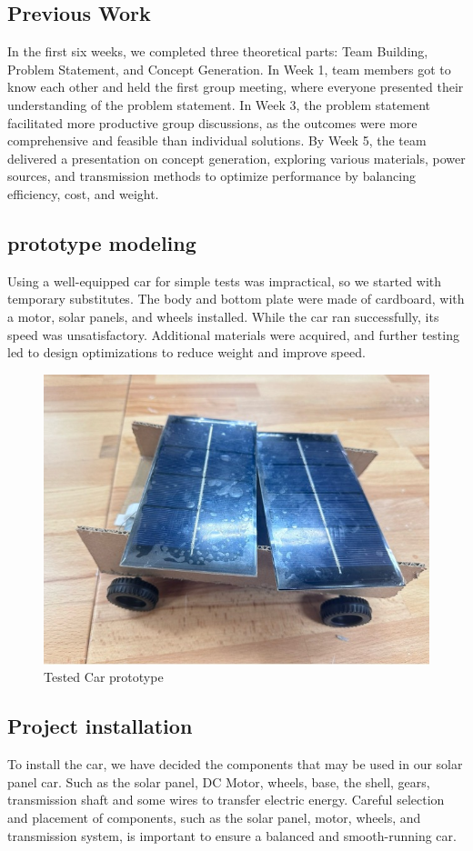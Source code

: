 \documentclass[12pt]{article}
\begin{document}
\subsection{Previous Work}
In the first six weeks, we completed three theoretical parts: Team Building, Problem Statement, and Concept Generation. In Week 1, team members got to know each other and held the first group meeting, where everyone presented their understanding of the problem statement. In Week 3, the problem statement facilitated more productive group discussions, as the outcomes were more comprehensive and feasible than individual solutions. By Week 5, the team delivered a presentation on concept generation, exploring various materials, power sources, and transmission methods to optimize performance by balancing efficiency, cost, and weight.
\subsection{prototype modeling}
Using a well-equipped car for simple tests was impractical, so we started with temporary substitutes. The body and bottom plate were made of cardboard, with a motor, solar panels, and wheels installed. While the car ran successfully, its speed was unsatisfactory. Additional materials were acquired, and further testing led to design optimizations to reduce weight and improve speed.
\begin{figure}[h] 
    \centering 
    \includegraphics[width=1\textwidth]{figure/car_prototype.jpg}
    \caption{Tested Car prototype}
\end{figure}
\subsection{Project installation}
\label{sec:installation}
To install the car, we have decided the components that may be used in our solar panel car.
Such as the solar panel, DC Motor, wheels, base, the shell, gears, transmission shaft and some wires to transfer electric energy. 
Careful selection and placement of components, such as the solar panel, motor, wheels, and transmission system, is important to ensure a balanced and smooth-running car\cite{Hapuwatte2017}. 
\end{document}

